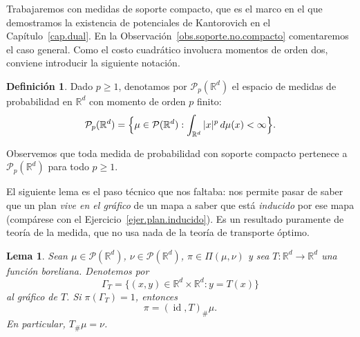 \documentclass[12pt, a4paper]{amsbook}
\newcommand{\id}{\operatorname{id}}
\newcommand{\R}{{\mathbb R}}
\newtheorem{lema}[teo]{Lema}
\theoremstyle{remark}
\theoremstyle{definition}
\newtheorem{defi}[teo]{Definición}
\numberwithin{section}{chapter}
\numberwithin{subsection}{section}
\numberwithin{equation}{section}
\numberwithin{figure}{chapter}
\begin{document}
Trabajaremos con medidas de soporte compacto, que es el marco en el que
demostramos la existencia de potenciales de Kantorovich en el
Capítulo~\ref{cap.dual}. En la Observación~\ref{obs.soporte.no.compacto}
comentaremos el caso general. Como el costo cuadrático involucra momentos de
orden dos, conviene introducir la siguiente notación.

\begin{defi}\label{def.Pp}
Dado $p\geq1$, denotamos por $\mathcal P_p(\R^d)$ el espacio de medidas de
probabilidad en $\R^d$ con momento de orden $p$ finito:
\[
\mathcal P_p(\R^d)
=
\Bigl\{
\mu\in\mathcal P(\R^d):
\int_{\R^d}|x|^p\,d\mu(x)<\infty
\Bigr\}.
\]
\end{defi}

Observemos que toda medida de probabilidad con soporte compacto pertenece a
$\mathcal P_p(\R^d)$ para todo $p\geq1$.

El siguiente lema es el paso técnico que nos faltaba: nos permite pasar de
saber que un plan \emph{vive en el gráfico} de un mapa a saber que está
\emph{inducido} por ese mapa (compárese con el
Ejercicio~\ref{ejer.plan.inducido}). Es un resultado puramente de teoría de la medida, que no
usa nada de la teoría de transporte óptimo.

\begin{lema}\label{lema.grafico}
Sean $\mu\in\mathcal P(\R^d)$, $\nu\in\mathcal P(\R^d)$, $\pi\in\Pi(\mu,\nu)$
y sea $T\colon\R^d\to\R^d$ una función boreliana. Denotemos por
\[
\Gamma_T=\{(x,y)\in\R^d\times\R^d: y=T(x)\}
\]
al gráfico de $T$. Si $\pi(\Gamma_T)=1$, entonces
\[
\pi=(\id,T)_\#\mu.
\]
En particular, $T_\#\mu=\nu$.
\end{lema}
\end{document}
